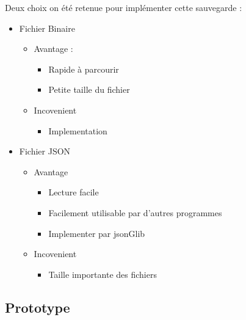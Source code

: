 \documentclass[12pt]{article}
\begin{document}
Deux choix on été retenue pour implémenter cette sauvegarde :

\begin{itemize}
\itemsep1pt\parskip0pt
\item
  Fichier Binaire

  \begin{itemize}
  \itemsep1pt\parskip0pt
  \item
    Avantage :

    \begin{itemize}
    \itemsep1pt\parskip0pt
    \item
      Rapide à parcourir
    \item
      Petite taille du fichier
    \end{itemize}
  \item
    Incovenient

    \begin{itemize}
    \itemsep1pt\parskip0pt
    \item
      Implementation
    \end{itemize}
  \end{itemize}
\item
  Fichier JSON

  \begin{itemize}
  \itemsep1pt\parskip0pt
  \item
    Avantage

    \begin{itemize}
    \itemsep1pt\parskip0pt
    \item
      Lecture facile
    \item
      Facilement utilisable par d'autres programmes
    \item
      Implementer par jsonGlib
    \end{itemize}
  \item
    Incovenient

    \begin{itemize}
    \itemsep1pt\parskip0pt
    \item
      Taille importante des fichiers
    \end{itemize}
  \end{itemize}
\end{itemize}

\subsection{Prototype}\label{prototype}
\end{document}
